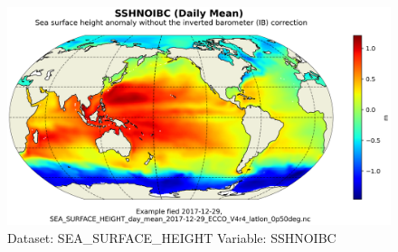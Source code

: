 \begin{figure}[H]
\centering
\includegraphics[scale=0.55]{../images/plots/latlon_plots/Sea_Surface_Height/SSHNOIBC.png}
\caption{Dataset: SEA\_SURFACE\_HEIGHT Variable: SSHNOIBC}
\label{tab:table-SEA_SURFACE_HEIGHT_SSHNOIBC-Plot}
\end{figure}